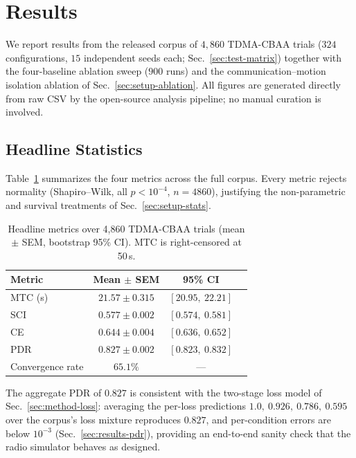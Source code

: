\section{Results}\label{sec:results}

We report results from the released corpus of $4{,}860$ TDMA-CBAA trials ($324$ configurations, $15$ independent seeds each; Sec.~\ref{sec:test-matrix}) together with the four-baseline ablation sweep ($900$ runs) and the communication--motion isolation ablation of Sec.~\ref{sec:setup-ablation}.
All figures are generated directly from raw CSV by the open-source analysis pipeline; no manual curation is involved.

\subsection{Headline Statistics}
Table~\ref{tab:headline} summarizes the four metrics across the full corpus.
Every metric rejects normality (Shapiro--Wilk, all $p < 10^{-4}$, $n = 4860$), justifying the non-parametric and survival treatments of Sec.~\ref{sec:setup-stats}.

\begin{table}[htbp]
\centering
\caption{Headline metrics over 4{,}860 TDMA-CBAA trials (mean $\pm$ SEM, bootstrap 95\% CI). MTC is right-censored at 50\,s.}
\label{tab:headline}
\begin{tabular}{@{}lccc@{}}
\toprule
Metric & Mean $\pm$ SEM & 95\% CI \\
\midrule
MTC (s) & $21.57 \pm 0.315$ & $[20.95,\ 22.21]$ \\
SCI     & $0.577 \pm 0.002$ & $[0.574,\ 0.581]$ \\
CE      & $0.644 \pm 0.004$ & $[0.636,\ 0.652]$ \\
PDR     & $0.827 \pm 0.002$ & $[0.823,\ 0.832]$ \\
\midrule
Convergence rate & $65.1\%$ & --- \\
\bottomrule
\end{tabular}
\end{table}

The aggregate PDR of $0.827$ is consistent with the two-stage loss model of Sec.~\ref{sec:method-loss}: averaging the per-loss predictions $1.0,\ 0.926,\ 0.786,\ 0.595$ over the corpus's loss mixture reproduces $0.827$, and per-condition errors are below $10^{-3}$ (Sec.~\ref{sec:results-pdr}), providing an end-to-end sanity check that the radio simulator behaves as designed.

